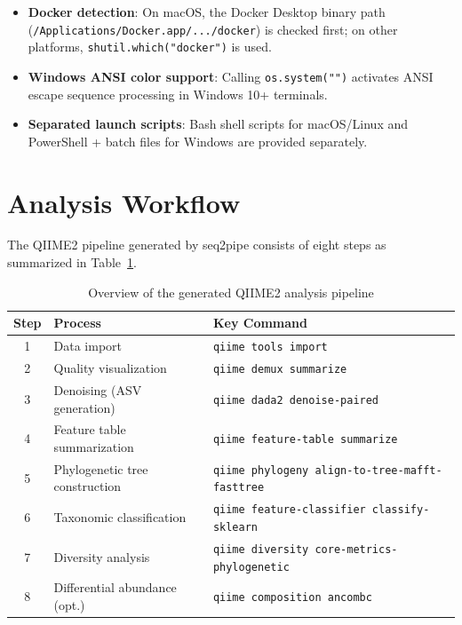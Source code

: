 \documentclass[12pt, a4paper]{article}
\begin{document}
\begin{itemize}
  \item \textbf{Docker detection}:
    On macOS, the Docker Desktop binary path
    (\texttt{/Applications/Docker.app/.../docker})
    is checked first; on other platforms, \texttt{shutil.which("docker")}
    is used.
  \item \textbf{Windows ANSI color support}:
    Calling \texttt{os.system("")} activates ANSI escape sequence
    processing in Windows 10+ terminals.
  \item \textbf{Separated launch scripts}:
    Bash shell scripts for macOS/Linux and
    PowerShell + batch files for Windows are provided separately.
\end{itemize}

\section{Analysis Workflow}

The QIIME2 pipeline generated by seq2pipe consists of eight steps
as summarized in Table~\ref{tab:workflow}.

\begin{table}[h]
  \centering
  \caption{Overview of the generated QIIME2 analysis pipeline}
  \label{tab:workflow}
  \begin{tabular}{clp{7.5cm}}
    \toprule
    \textbf{Step} & \textbf{Process} & \textbf{Key Command} \\
    \midrule
    1 & Data import &
      \texttt{qiime tools import} \\
    2 & Quality visualization &
      \texttt{qiime demux summarize} \\
    3 & Denoising (ASV generation) &
      \texttt{qiime dada2 denoise-paired} \\
    4 & Feature table summarization &
      \texttt{qiime feature-table summarize} \\
    5 & Phylogenetic tree construction &
      \texttt{qiime phylogeny align-to-tree-mafft-fasttree} \\
    6 & Taxonomic classification &
      \texttt{qiime feature-classifier classify-sklearn} \\
    7 & Diversity analysis &
      \texttt{qiime diversity core-metrics-phylogenetic} \\
    8 & Differential abundance (opt.) &
      \texttt{qiime composition ancombc} \\
    \bottomrule
  \end{tabular}
\end{table}
\end{document}
